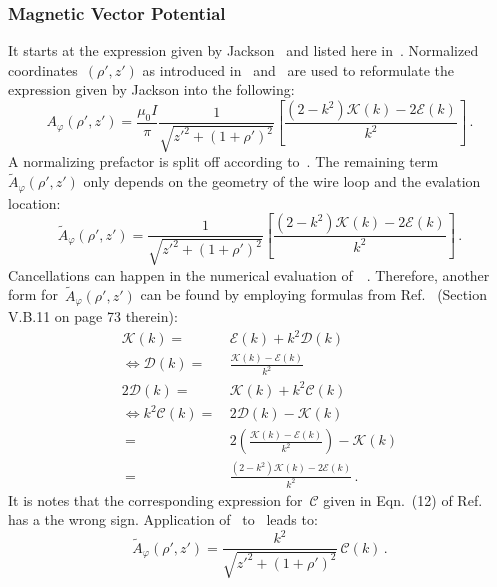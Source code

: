 \subsubsection{Magnetic Vector Potential}
It starts at the expression given by Jackson~\cite{jackson}
and listed here in~.
Normalized coordinates~$(\rho', z')$ as introduced in~ and~
are used to reformulate the expression given by Jackson into the following:
\begin{equation}
 A_\varphi(\rho', z')
   = \frac{\mu_0 I}{\pi}
     \frac{1}{\sqrt{z'^2 + (1 + \rho')^2}}
     \left[ \frac{(2 - k^2)\mathcal{K}(k) - 2 \mathcal{E}(k)}{k^2} \right] \, . \label{eqn:cwl_A_phi_initial}
\end{equation}
A normalizing prefactor is split off according to~.
The remaining term~$\tilde{A}_\varphi(\rho',z')$ only depends on the geometry of the wire loop
and the evalation location:
\begin{equation}
  \tilde{A}_\varphi(\rho', z')
  = \frac{1}{\sqrt{z'^2 + (1 + \rho')^2}}
    \left[ \frac{(2 - k^2)\mathcal{K}(k) - 2 \mathcal{E}(k)}{k^2} \right] \, . \label{eqn:aNormJackson}
\end{equation}
Cancellations can happen in the numerical evaluation of~~\cite{bulirsch_3}.
Therefore, another form for~$\tilde{A}_\varphi(\rho',z')$ can be found by employing
formulas from Ref.~\cite{jahnke_emde} (Section V.B.11 on page 73 therein):
\begin{align}
                 \mathcal{K}(k) =&\, \mathcal{E}(k) + k^2 \mathcal{D}(k) \nonumber \\
 \Leftrightarrow \mathcal{D}(k) =&\, \frac{\mathcal{K}(k) - \mathcal{E}(k)}{k^2} \\
               2 \mathcal{D}(k) =&\, \mathcal{K}(k) + k^2 \mathcal{C}(k) \nonumber \\
 \Leftrightarrow k^2 \mathcal{C}(k) =&\, 2 \mathcal{D}(k) - \mathcal{K}(k) \nonumber \\
                     ~              =&\, 2 \left( \frac{\mathcal{K}(k) - \mathcal{E}(k)}{k^2} \right) - \mathcal{K}(k) \nonumber \\
                     ~              =&\, \frac{(2 - k^2) \mathcal{K}(k) - 2 \mathcal{E}(k)}{k^2} \, . \label{eqn:kSqC}
\end{align}
It is notes that the corresponding expression for~$\mathcal{C}$ given in Eqn.~(12) of Ref.~\cite{walstrom_2017}
has a the wrong sign.
Application of~ to~ leads to:
\begin{equation}
  \tilde{A}_\varphi(\rho', z')
  = \frac{k^2}{\sqrt{z'^2 + (1 + \rho')^2}} \,\mathcal{C}(k)\, .
\end{equation}

